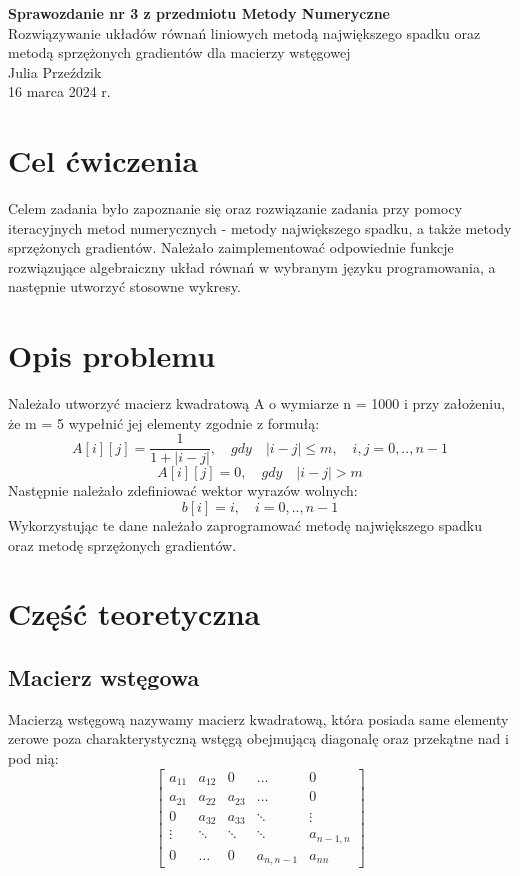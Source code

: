 \documentclass{article}
\begin{document}
\Large
\begin{center}
{\LARGE \textbf{Sprawozdanie nr 3 z przedmiotu Metody Numeryczne}}
\\
{\large{Rozwiązywanie układów równań liniowych metodą największego spadku oraz metodą sprzężonych gradientów dla macierzy wstęgowej
}}
\\
{\large{Julia Przeździk}}
\\
\normalsize{16 marca 2024 r.}
\\
\end{center}
\large
\tableofcontents
\newpage
\section{Cel ćwiczenia}
Celem zadania było zapoznanie się oraz rozwiązanie zadania przy pomocy iteracyjnych metod numerycznych - metody największego spadku, a także metody sprzężonych gradientów. Należało zaimplementować odpowiednie funkcje rozwiązujące algebraiczny układ równań w wybranym języku programowania, a następnie utworzyć stosowne wykresy.
\section{Opis problemu}
Należało utworzyć macierz kwadratową A o wymiarze n = 1000 i przy założeniu, że m = 5 wypełnić jej elementy zgodnie z formułą:
\begin{equation*}
    A[i][j] = \frac{1}{1+|i-j|}, \quad gdy \quad|i-j| \leq{m}, \quad i,j = 0,..,n-1
\end{equation*}
\begin{equation*}
    A[i][j] = 0,  \quad gdy \quad |i-j| > m
\end{equation*}
Następnie należało zdefiniować wektor wyrazów wolnych:
\begin{equation*}
    b[i] = i, \quad i = 0,..,n-1
\end{equation*}
Wykorzystując te dane należało zaprogramować metodę największego spadku oraz metodę sprzężonych gradientów.
\section{Część teoretyczna}
\subsection{Macierz wstęgowa}
Macierzą wstęgową nazywamy macierz kwadratową, która posiada same elementy zerowe poza charakterystyczną wstęgą obejmującą diagonalę oraz przekątne nad i pod nią:
\[
\begin{bmatrix}
a_{11} & a_{12} & 0 & \dots & 0 \\
a_{21} & a_{22} & a_{23} & \dots & 0 \\
0 & a_{32} & a_{33} & \ddots & \vdots \\
\vdots & \ddots & \ddots & \ddots & a_{n-1,n} \\
0 & \dots & 0 & a_{n,n-1} & a_{nn}
\end{bmatrix}
\]
\end{document}
